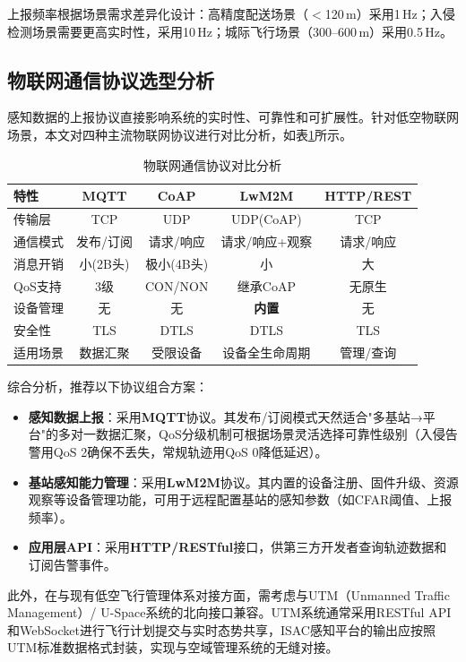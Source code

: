 上报频率根据场景需求差异化设计：高精度配送场景（$<$120\,m）采用1\,Hz；入侵检测场景需要更高实时性，采用10\,Hz；城际飞行场景（300--600\,m）采用0.5\,Hz。

\subsection{物联网通信协议选型分析}

感知数据的上报协议直接影响系统的实时性、可靠性和可扩展性。针对低空物联网场景，本文对四种主流物联网协议进行对比分析，如表\ref{tab:protocol}所示。

\begin{table}[H]
\centering\caption{物联网通信协议对比分析}\label{tab:protocol}
\begin{tabular}{lcccc}
\toprule
特性 & \textbf{MQTT} & \textbf{CoAP} & \textbf{LwM2M} & \textbf{HTTP/REST} \\
\midrule
传输层 & TCP & UDP & UDP(CoAP) & TCP \\
通信模式 & 发布/订阅 & 请求/响应 & 请求/响应+观察 & 请求/响应 \\
消息开销 & 小(2B头) & 极小(4B头) & 小 & 大 \\
QoS支持 & 3级 & CON/NON & 继承CoAP & 无原生 \\
设备管理 & 无 & 无 & \textbf{内置} & 无 \\
安全性 & TLS & DTLS & DTLS & TLS \\
适用场景 & 数据汇聚 & 受限设备 & 设备全生命周期 & 管理/查询 \\
\bottomrule
\end{tabular}
\end{table}

综合分析，推荐以下协议组合方案：
\begin{itemize}
  \item \textbf{感知数据上报}：采用\textbf{MQTT}协议。其发布/订阅模式天然适合"多基站→平台"的多对一数据汇聚，QoS分级机制可根据场景灵活选择可靠性级别（入侵告警用QoS 2确保不丢失，常规轨迹用QoS 0降低延迟）。
  \item \textbf{基站感知能力管理}：采用\textbf{LwM2M}协议。其内置的设备注册、固件升级、资源观察等设备管理功能，可用于远程配置基站的感知参数（如CFAR阈值、上报频率）。
  \item \textbf{应用层API}：采用\textbf{HTTP/RESTful}接口，供第三方开发者查询轨迹数据和订阅告警事件。
\end{itemize}

此外，在与现有低空飞行管理体系对接方面，需考虑与UTM（Unmanned Traffic Management）/ U-Space系统的北向接口兼容。UTM系统通常采用RESTful API和WebSocket进行飞行计划提交与实时态势共享，ISAC感知平台的输出应按照UTM标准数据格式封装，实现与空域管理系统的无缝对接。

